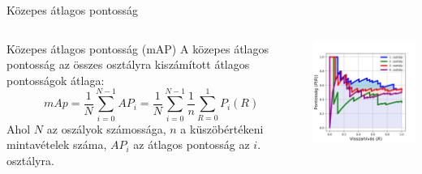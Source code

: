 \documentclass[english, aspectratio=169]{beamer}
\begin{document}
\begin{frame}{Közepes átlagos pontosság}
\begin{columns}
\begin{column}{.5\textwidth}
\begin{block}{Közepes átlagos pontosság (mAP)}
A közepes átlagos pontosság az összes osztályra kiszámított átlagos pontosságok átlaga:
\[
mAp = \frac{1}{N} \sum_{i=0}^{N-1} AP_i = \frac{1}{N} \sum_{i=0}^{N-1} \frac{1}{n} \sum_{R=0}^1 P_i(R)
\]
Ahol $N$ az oszályok számossága, $n$ a küszöbértékeni mintavételek száma, $AP_i$ az átlagos pontosság  az $i$. osztályra.
\end{block}
\end{column}
\begin{column}{.5\textwidth}
\begin{center}
\includegraphics[width=7cm, keepaspectratio]{images/od_13.png}
\end{center}
\end{column}
\end{columns}
\end{frame}
\end{document}
